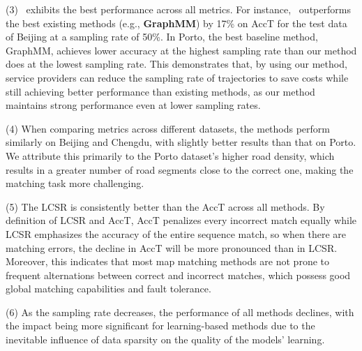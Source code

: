 \noindent (3) \textbf{\modelName}~exhibits the best performance across all metrics. For instance, \textbf{\modelName}~outperforms the best existing methods (e.g., \textbf{GraphMM}) by 17\% on AccT for the test data of Beijing at a sampling rate of 50\%. In Porto, the best baseline method, GraphMM, achieves lower accuracy at the highest sampling rate than our method does at the lowest sampling rate. This demonstrates that, by using our method, service providers can reduce the sampling rate of trajectories to save costs while still achieving better performance than existing methods, as our method maintains strong performance even at lower sampling rates.


\noindent (4) When comparing metrics across different datasets, the methods perform similarly on Beijing and Chengdu, with slightly better results than that on Porto. We attribute this primarily to the Porto dataset’s higher road density, which results in a greater number of road segments close to the correct one, making the matching task more challenging.

\noindent (5) The LCSR is consistently better than the AccT across all methods. By definition of LCSR and AccT, AccT penalizes every incorrect match equally while LCSR emphasizes the accuracy of the entire sequence match, so when there are matching errors, the decline in AccT will be more pronounced than in LCSR. Moreover, this indicates that most map matching methods are not prone to frequent alternations between correct and incorrect matches, which possess good global matching capabilities and fault tolerance.

\noindent (6) As the sampling rate decreases, the performance of all methods declines, with the impact being more significant for learning-based methods due to the inevitable influence of data sparsity on the quality of the models' learning. 

